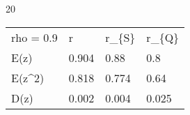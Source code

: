 
20
\begin{tabular}{llll}
\hline
 rho = 0.9 & r     & r\_\{S\} & r\_\{Q\} \\
 E(z)      & 0.904 & 0.88  & 0.8   \\
 E(z\^{}2)    & 0.818 & 0.774 & 0.64  \\
 D(z)      & 0.002 & 0.004 & 0.025 \\
\hline
\end{tabular}